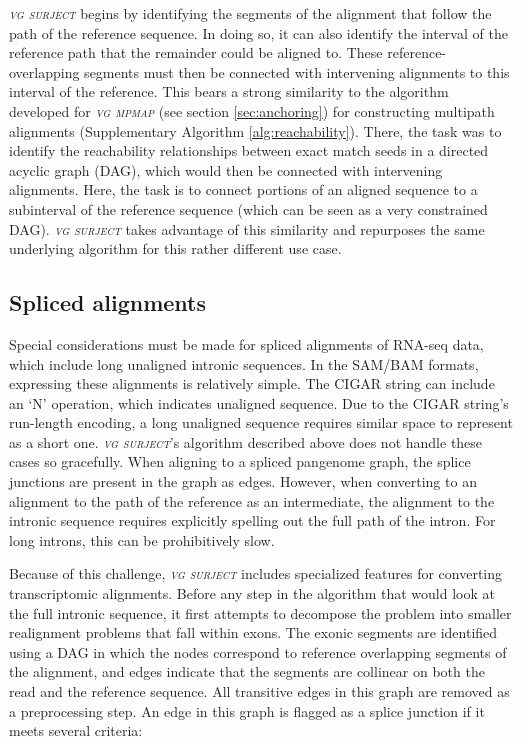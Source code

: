 \documentclass[11pt]{ucthesis}
\newcommand{\tool}[1]{\emph{\textsc{#1}}}
\begin{document}
\tool{vg surject} begins by identifying the segments of the alignment that follow the path of the reference sequence. In doing so, it can also identify the interval of the reference path that the remainder could be aligned to. These reference-overlapping segments must then be connected with intervening alignments to this interval of the reference. This bears a strong similarity to the algorithm developed for \tool{vg mpmap} (see section \ref{sec:anchoring}) for constructing multipath alignments (Supplementary Algorithm \ref{alg:reachability}). There, the task was to identify the reachability relationships between exact match seeds in a directed acyclic graph (DAG), which would then be connected with intervening alignments. Here, the task is to connect portions of an aligned sequence to a subinterval of the reference sequence (which can be seen as a very constrained DAG). \tool{vg surject} takes advantage of this similarity and repurposes the same underlying algorithm for this rather different use case.

\subsection{Spliced alignments}

Special considerations must be made for spliced alignments of RNA-seq data, which include long unaligned intronic sequences. In the SAM/BAM formats, expressing these alignments is relatively simple. The CIGAR string can include an `N' operation, which indicates unaligned sequence. Due to the CIGAR string's run-length encoding, a long unaligned sequence requires similar space to represent as a short one. \tool{vg surject}'s algorithm described above does not handle these cases so gracefully. When aligning to a spliced pangenome graph, the splice junctions are present in the graph as edges. However, when converting to an alignment to the path of the reference as an intermediate, the alignment to the intronic sequence requires explicitly spelling out the full path of the intron. For long introns, this can be prohibitively slow.

Because of this challenge, \tool{vg surject} includes specialized features for converting transcriptomic alignments. Before any step in the algorithm that would look at the full intronic sequence, it first attempts to decompose the problem into smaller realignment problems that fall within exons. The exonic segments are identified using a DAG in which the nodes correspond to reference overlapping segments of the alignment, and edges indicate that the segments are collinear on both the read and the reference sequence. All transitive edges in this graph are removed as a preprocessing step. An edge in this graph is flagged as a splice junction if it meets several criteria: 
\end{document}
